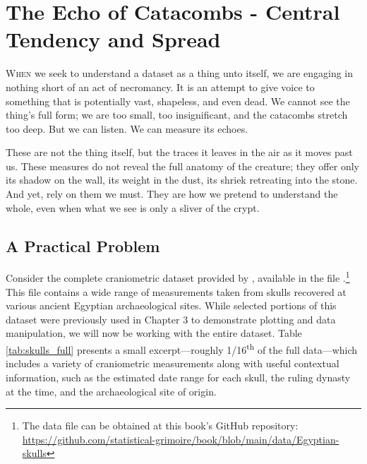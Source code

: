 \chapter{The Echo of Catacombs - Central Tendency and Spread}

\IMFellEnglish
\lettrine[lines=5, realheight]{W}{hen} we seek to understand a dataset as a thing unto itself, we are engaging in nothing short of an act of necromancy. It is an attempt to give voice to something that is potentially vast, shapeless, and even dead. We cannot see the thing's full form; we are too small, too insignificant, and the catacombs stretch too deep. But we can listen. We can measure its echoes. 

These are not the thing itself, but the traces it leaves in the air as it moves past us. These measures do not reveal the full anatomy of the creature; they offer only its shadow on the wall, its weight in the dust, its shriek retreating into the stone. And yet, rely on them we must. They are how we pretend to understand the whole, even when what we see is only a sliver of the crypt.

\normalfont

\section{A Practical Problem}

Consider the complete craniometric dataset provided by  \textcite{Thomson1905}, available in the file .\footnote{The data file can be obtained at this book's GitHub repository: \url{https://github.com/statistical-grimoire/book/blob/main/data/Egyptian-skulls}} This file contains a wide range of measurements taken from skulls recovered at various ancient Egyptian archaeological sites. While selected portions of this dataset were previously used in Chapter 3 to demonstrate plotting and data manipulation, we will now be working with the entire dataset. Table \ref{tab:skulls_full} presents a small excerpt—roughly 1/16\textsuperscript{th} of the full data—which includes a variety of craniometric measurements along with useful contextual information, such as the estimated date range for each skull, the ruling dynasty at the time, and the archaeological site of origin.

